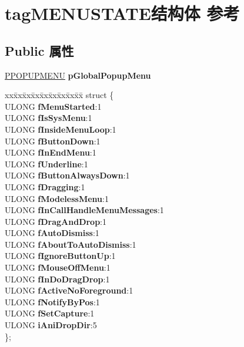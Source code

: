 \hypertarget{structtag_m_e_n_u_s_t_a_t_e}{}\section{tag\+M\+E\+N\+U\+S\+T\+A\+T\+E结构体 参考}
\label{structtag_m_e_n_u_s_t_a_t_e}
\subsection*{Public 属性}
\begin{DoxyCompactItemize}
\item 
\mbox{\label{structtag_m_e_n_u_s_t_a_t_e_adeb51801de4e072fb1b105cb5f2b2c5f}} 
\hyperlink{structtag_p_o_p_u_p_m_e_n_u}{P\+P\+O\+P\+U\+P\+M\+E\+NU} {\bfseries p\+Global\+Popup\+Menu}
\item 
\mbox{\label{structtag_m_e_n_u_s_t_a_t_e_a6e7cdc21ba09d016dfbb83b585e7b796}} 
\begin{tabbing}
xx\=xx\=xx\=xx\=xx\=xx\=xx\=xx\=xx\=\kill
struct \{\\
\>ULONG {\bfseries fMenuStarted}:1\\
\>ULONG {\bfseries fIsSysMenu}:1\\
\>ULONG {\bfseries fInsideMenuLoop}:1\\
\>ULONG {\bfseries fButtonDown}:1\\
\>ULONG {\bfseries fInEndMenu}:1\\
\>ULONG {\bfseries fUnderline}:1\\
\>ULONG {\bfseries fButtonAlwaysDown}:1\\
\>ULONG {\bfseries fDragging}:1\\
\>ULONG {\bfseries fModelessMenu}:1\\
\>ULONG {\bfseries fInCallHandleMenuMessages}:1\\
\>ULONG {\bfseries fDragAndDrop}:1\\
\>ULONG {\bfseries fAutoDismiss}:1\\
\>ULONG {\bfseries fAboutToAutoDismiss}:1\\
\>ULONG {\bfseries fIgnoreButtonUp}:1\\
\>ULONG {\bfseries fMouseOffMenu}:1\\
\>ULONG {\bfseries fInDoDragDrop}:1\\
\>ULONG {\bfseries fActiveNoForeground}:1\\
\>ULONG {\bfseries fNotifyByPos}:1\\
\>ULONG {\bfseries fSetCapture}:1\\
\>ULONG {\bfseries iAniDropDir}:5\\
\}; \\


\end{tabbing}
\end{DoxyCompactItemize}
